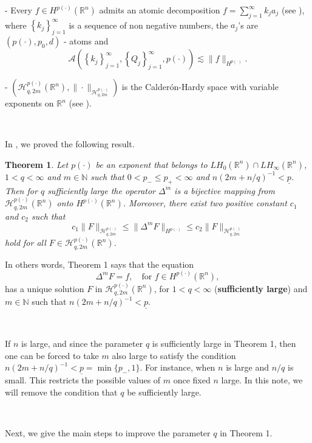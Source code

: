 \documentclass[oneside,10pt]{article}
\newtheorem{theorem}{Theorem}
\begin{document}
- Every $f \in H^{p(\cdot)}(\mathbb{R}^n)$ admits an atomic decomposition $f=\sum\limits_{j=1}^{\infty }k_{j}a_{j}$ (see \cite{Nakai}), where 
$\left\{ k_{j}\right\}_{j=1}^{\infty }$ is a sequence of non negative numbers, the $a_{j}$'s are $(p(\cdot),p_{0},d)$ - atoms and 
\[
\mathcal{A}\left( \left\{ k_{j}\right\}_{j=1}^{\infty },\left\{ Q_{j}\right\} _{j=1}^{\infty }, p(\cdot)\right) \lesssim 
\|f \|_{H^{p(\cdot)}}.
\]

- $\left( \mathcal{H}^{p(\cdot)}_{q, 2m}(\mathbb{R}^{n}), \| \cdot \|_{\mathcal{H}^{p(\cdot)}_{q, 2m}} \right)$ is the Calder\'on-Hardy space with variable exponents on $\mathbb{R}^n$ (see \cite{Rocha}).

\

In \cite{Rocha}, we proved the following result.

\begin{theorem} Let $p(\cdot)$ be an exponent that belongs to $LH_{0}(\mathbb{R}^{n})\cap LH_{\infty}(\mathbb{R}^{n})$, 
$1 < q < \infty$ and $m \in \mathbb{N}$ such that $0 < p_{-} \leq p_{+} < \infty$ and $n (2m + n/q)^{-1} < \underline{p}$. Then 
for $q$ sufficiently large the operator $\Delta^{m}$ is a bijective mapping from $\mathcal{H}^{p(\cdot)}_{q, 2m}(\mathbb{R}^{n})$ onto 
$H^{p(\cdot)}(\mathbb{R}^{n})$. Moreover, there exist two positive constant $c_1$ and $c_2$ such that
\[
c_1 \|F \|_{\mathcal{H}^{p(\cdot)}_{q, 2m}} \leq \| \Delta^{m}F \|_{H^{p(\cdot)}} \leq c_2 \|F \|_{\mathcal{H}^{p(\cdot)}_{q, 2m}}
\]
hold for all $F \in \mathcal{H}^{p(\cdot)}_{q, 2m}(\mathbb{R}^{n})$.
\end{theorem}

In others words, Theorem 1 says that the equation
\[
\Delta^m F = f, \,\,\,\,\,\, \text{for} \,\, f \in H^{p(\cdot)}(\mathbb{R}^n),
\]
has a unique solution $F$ in $\mathcal{H}^{p(\cdot)}_{q, 2m}(\mathbb{R}^{n})$, for $1 < q < \infty$ ({\bf sufficiently large}) and 
$m \in \mathbb{N}$ such that $n (2m + n/q)^{-1} < \underline{p}$.

\

If $n$ is large, and since the parameter $q$ is sufficiently large in Theorem 1, then one can be forced to take $m$ also large to satisfy the condition $n (2m + n/q)^{-1} < \underline{p} = \min \{ p_{-}, 1 \}$. For instance, when $n$ is large and $n/q$ is small. This restricts the possible values of $m$ once fixed $n$ large. In this note, we will remove the condition that $q$ be sufficiently large.

\

Next, we give the main steps to improve the parameter $q$ in Theorem 1.
\end{document}
